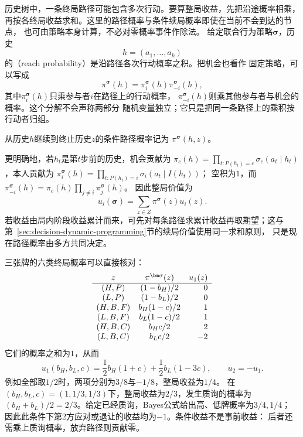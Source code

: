 历史树中，一条终局路径可能包含多次行动。要算整局收益，先把沿途概率相乘，
再按各终局收益求和。这里的路径概率与条件续局概率即使在当前不会到达的节点，
也可由策略本身计算，不必对零概率事件作除法。
给定联合行为策略\(\bm{\sigma}\)，历史
\[
  h=(a_1,\ldots,a_k)
\]
的（reach probability）是沿路径各次行动概率之积。把机会也看作
固定策略，可以写成
\begin{equation}
  \pi^{\bm{\sigma}}(h)
  =
  \pi_i^{\bm{\sigma}}(h)
  \pi_{-i}^{\bm{\sigma}}(h),
  \label{eq:game-reach-factorization}
\end{equation}
其中\(\pi_i^{\bm{\sigma}}(h)\)只乘参与者\(i\)在路径上的行动概率，
\(\pi_{-i}^{\bm{\sigma}}(h)\)则乘其他参与者与机会的概率。这个分解不会声称两部分
随机变量独立；它只是把同一条路径上的乘积按行动者归组。

从历史\(h\)继续到终止历史\(z\)的条件路径概率记为
\(\pi^{\bm{\sigma}}(h,z)\)。

更明确地，若\(h_t\)是第\(t\)步前的历史，机会贡献为
\(\pi_c(h)=\prod_{t:P(h_t)=c}\sigma_c(a_t\mid h_t)\)，本人贡献为
\(\pi_i^{\bm\sigma}(h)=\prod_{t:P(h_t)=i}\sigma_i(a_t\mid I(h_t))\)；
空积为\(1\)，而\(\pi_{-i}^{\bm\sigma}(h)=\pi_c(h)\prod_{j\ne i}\pi_j^{\bm\sigma}(h)\)。
因此整局价值为
\begin{equation}
  u_i(\bm\sigma)=\sum_{z\in Z}\pi^{\bm\sigma}(z)u_i(z).
  \label{eq:game-terminal-payoff}
\end{equation}
若收益由局内阶段收益累计而来，可先对每条路径求累计收益再取期望；这与
第~\ref{sec:decision-dynamic-programming}节的续局价值使用同一求和原则，
只是现在路径概率由多方共同决定。

三张牌的六类终局概率可以直接核对：
\[
\begin{array}{c@{\quad}c@{\quad}r}
 z&\pi^{\bm\sigma}(z)&u_1(z)\\ \hline
 (H,P)&(1-b_H)/2&0\\
 (L,P)&(1-b_L)/2&0\\
 (H,B,F)&b_H(1-c)/2&1\\
 (L,B,F)&b_L(1-c)/2&1\\
 (H,B,C)&b_Hc/2&2\\
 (L,B,C)&b_Lc/2&-2
\end{array}
\]
它们的概率之和为\(1\)，从而
\begin{equation}
  u_1(b_H,b_L,c)
  =\frac12 b_H(1+c)+\frac12 b_L(1-3c),
  \qquad u_2=-u_1.
  \label{eq:game-card-behavior-payoff}
\end{equation}
例如全部取\(1/2\)时，两项分别为\(3/8\)与\(-1/8\)，整局收益为\(1/4\)。
在\((b_H,b_L,c)=(1,1/3,1/3)\)下，整局收益为\(2/3\)，发生质询的概率为
\((b_H+b_L)/2=2/3\)。给定已经质询，Bayes公式给出高、低牌概率为\(3/4,1/4\)；
因此此条件下第2方应对或退让的收益均为\(-1\)。条件收益不是事前收益：
后者还需乘上质询概率，放弃路径则贡献零。

